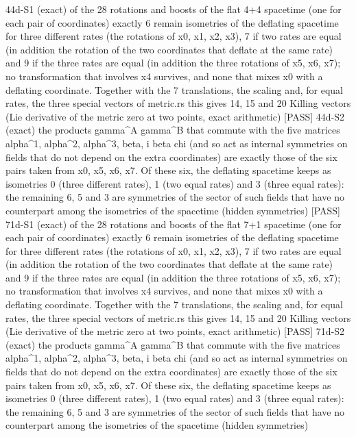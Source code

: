 \documentclass[
  10pt,
]{article}
\newenvironment{Shaded}{}{}
\newcommand{\NormalTok}[1]{#1}
\begin{document}
\begin{Shaded}
\begin{Highlighting}[]
\NormalTok{[PASS] 44d{-}S1  (exact) of the 28 rotations and boosts of the flat 4+4 spacetime (one for each pair of coordinates) exactly 6 remain isometries of the deflating spacetime for three different rates (the rotations of x0, x1, x2, x3), 7 if two rates are equal (in addition the rotation of the two coordinates that deflate at the same rate) and 9 if the three rates are equal (in addition the three rotations of x5, x6, x7); no transformation that involves x4 survives, and none that mixes x0 with a deflating coordinate. Together with the 7 translations, the scaling and, for equal rates, the three special vectors of metric.rs this gives 14, 15 and 20 Killing vectors (Lie derivative of the metric zero at two points, exact arithmetic)}
\NormalTok{[PASS] 44d{-}S2  (exact) the products gamma\^{}A gamma\^{}B that commute with the five matrices alpha\^{}1, alpha\^{}2, alpha\^{}3, beta, i beta chi (and so act as internal symmetries on fields that do not depend on the extra coordinates) are exactly those of the six pairs taken from x0, x5, x6, x7. Of these six, the deflating spacetime keeps as isometries 0 (three different rates), 1 (two equal rates) and 3 (three equal rates): the remaining 6, 5 and 3 are symmetries of the sector of such fields that have no counterpart among the isometries of the spacetime (hidden symmetries)}
\NormalTok{[PASS] 71d{-}S1  (exact) of the 28 rotations and boosts of the flat 7+1 spacetime (one for each pair of coordinates) exactly 6 remain isometries of the deflating spacetime for three different rates (the rotations of x0, x1, x2, x3), 7 if two rates are equal (in addition the rotation of the two coordinates that deflate at the same rate) and 9 if the three rates are equal (in addition the three rotations of x5, x6, x7); no transformation that involves x4 survives, and none that mixes x0 with a deflating coordinate. Together with the 7 translations, the scaling and, for equal rates, the three special vectors of metric.rs this gives 14, 15 and 20 Killing vectors (Lie derivative of the metric zero at two points, exact arithmetic)}
\NormalTok{[PASS] 71d{-}S2  (exact) the products gamma\^{}A gamma\^{}B that commute with the five matrices alpha\^{}1, alpha\^{}2, alpha\^{}3, beta, i beta chi (and so act as internal symmetries on fields that do not depend on the extra coordinates) are exactly those of the six pairs taken from x0, x5, x6, x7. Of these six, the deflating spacetime keeps as isometries 0 (three different rates), 1 (two equal rates) and 3 (three equal rates): the remaining 6, 5 and 3 are symmetries of the sector of such fields that have no counterpart among the isometries of the spacetime (hidden symmetries)}

\end{Highlighting}
\end{Shaded}
\end{document}
